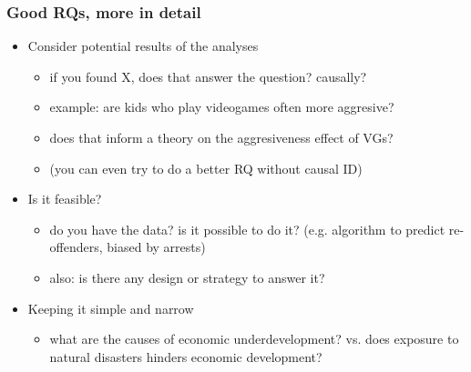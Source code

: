 \begin{frame}
\frametitle{Good RQs, more in detail}
\centering

\begin{itemize}
  \item[1.] Consider potential results of the analyses
  \begin{itemize}
    \item if you found X, does that answer the question? causally?
    \item example: are kids who play videogames often more aggresive?
    \item does that inform a theory on the aggresiveness effect of VGs?
    \item[] (you can even try to do a better RQ without causal ID)
  \end{itemize}
  \item<2->[2.] Is it feasible?
  \begin{itemize}
    \item do you have the data? is it possible to do it? (e.g. algorithm to predict re-offenders, biased by arrests)
    \item also: is there any design or strategy to answer it?
  \end{itemize}
  \item<3->[3.] Keeping it simple and narrow
  \begin{itemize}
    \item what are the causes of economic underdevelopment? vs. does exposure to natural disasters hinders economic development?
  \end{itemize}
\end{itemize}

\end{frame}

